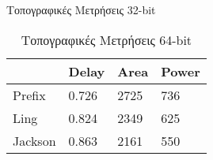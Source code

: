 \begin{multicols}{2}
\begin{table}[H]
\caption{Τοπογραφικές Μετρήσεις 32-bit}
\label{topo_result_table_32}
\end{table}
\begin{table}[H]
\centering
     \begin{tabular}{||p{1.2cm} | p{0.7cm} p{1cm} p{1cm} ||} 
        \hline
         & Delay & Area & Power \\ [0.5ex] 
        \hline\hline
        Prefix  & 0.726  & 2725    & 736 \\ 
        \hline
        Ling    & 0.824  & 2349    & 625 \\
        \hline
        Jackson & 0.863  & 2161    & 550 \\
        \hline
    \end{tabular}
\caption{Τοπογραφικές Μετρήσεις 64-bit}
\label{topo_result_table_64}
\end{table}
\end{multicols}




















